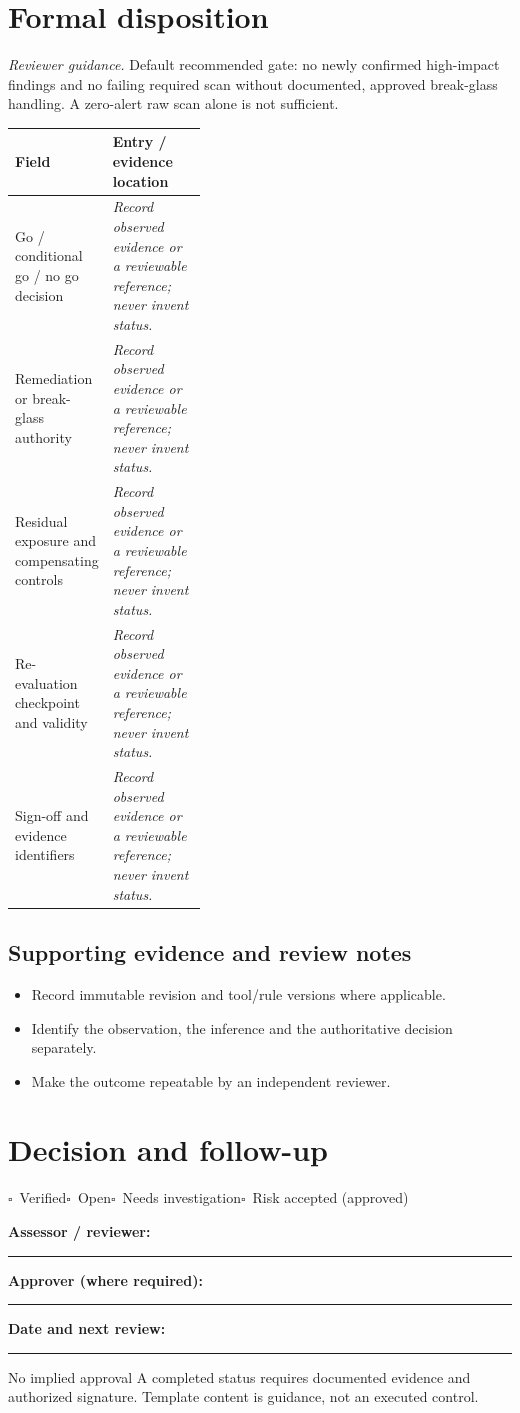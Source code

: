 \documentclass[10pt,letterpaper]{article}
\newcommand{\checkbox}{\(\square\)}
\newcommand{\blankline}{\noindent\rule{\linewidth}{0.35pt}\par\vspace{4pt}}
\begin{document}
\section{Formal disposition}
\textit{Reviewer guidance.} Default recommended gate: no newly confirmed high-impact findings and no failing required scan without documented, approved break-glass handling. A zero-alert raw scan alone is not sufficient.
\begin{tabularx}{\linewidth}{@{}p{0.38\linewidth}Y@{}}
\toprule Field & Entry / evidence location\\\midrule
Go / conditional go / no go decision & \textit{Record observed evidence or a reviewable reference; never invent status.}\\[1.0em]
\midrule
Remediation or break-glass authority & \textit{Record observed evidence or a reviewable reference; never invent status.}\\[1.0em]
\midrule
Residual exposure and compensating controls & \textit{Record observed evidence or a reviewable reference; never invent status.}\\[1.0em]
\midrule
Re-evaluation checkpoint and validity & \textit{Record observed evidence or a reviewable reference; never invent status.}\\[1.0em]
\midrule
Sign-off and evidence identifiers & \textit{Record observed evidence or a reviewable reference; never invent status.}\\[1.0em]
\midrule
\end{tabularx}
\subsection{Supporting evidence and review notes}
\begin{itemize}
\item Record immutable revision and tool/rule versions where applicable.
\item Identify the observation, the inference and the authoritative decision separately.
\item Make the outcome repeatable by an independent reviewer.
\end{itemize}
\clearpage
\section{Decision and follow-up}
\noindent\checkbox\ Verified\quad\checkbox\ Open\quad\checkbox\ Needs investigation\quad\checkbox\ Risk accepted (approved)\par
\noindent\textbf{Assessor / reviewer:}\par\blankline\textbf{Approver (where required):}\par\blankline\textbf{Date and next review:}\par\blankline
\begin{warnbox}{No implied approval}
A completed status requires documented evidence and authorized signature. Template content is guidance, not an executed control.\end{warnbox}
\end{document}
